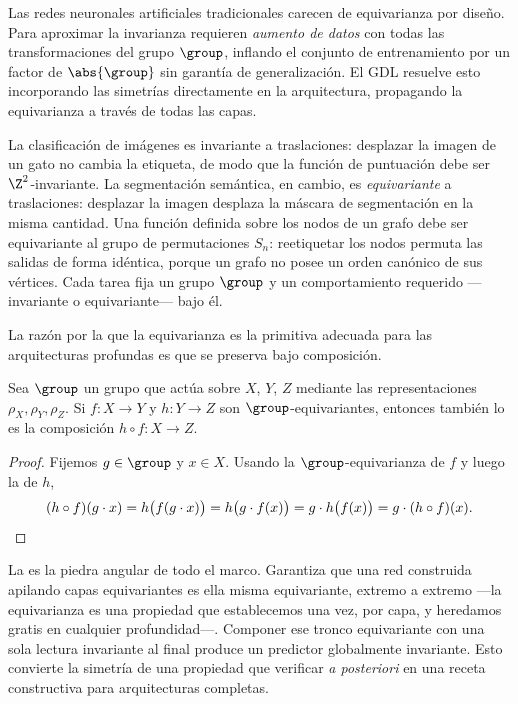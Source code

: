 Las redes neuronales artificiales tradicionales carecen de equivarianza por
dise\~no. Para aproximar la invarianza requieren \emph{aumento de datos} con todas
las transformaciones del grupo $\group$, inflando el conjunto de entrenamiento
por un factor de $\abs{\group}$ sin garant\'ia de generalizaci\'on. El GDL
resuelve esto incorporando las simetr\'ias directamente en la arquitectura,
propagando la equivarianza a trav\'es de todas las capas.

\begin{example}
\label{ex:priors:symmetries}
La clasificaci\'on de im\'agenes es invariante a traslaciones: desplazar la imagen
de un gato no cambia la etiqueta, de modo que la funci\'on de puntuaci\'on debe
ser $\Z^2$-invariante. La segmentaci\'on sem\'antica, en cambio, es
\emph{equivariante} a traslaciones: desplazar la imagen desplaza la m\'ascara de
segmentaci\'on en la misma cantidad. Una funci\'on definida sobre los nodos de un
grafo debe ser equivariante al grupo de permutaciones $S_n$: reetiquetar los
nodos permuta las salidas de forma id\'entica, porque un grafo no posee un orden
can\'onico de sus v\'ertices. Cada tarea fija un grupo $\group$ y un
comportamiento requerido ---invariante o equivariante--- bajo \'el.
\end{example}

La raz\'on por la que la equivarianza es la primitiva adecuada para las
arquitecturas profundas es que se preserva bajo composici\'on.

\begin{theorem}
\label{thm:priors:composition}
Sea $\group$ un grupo que act\'ua sobre $X$, $Y$, $Z$ mediante las
representaciones $\rho_X, \rho_Y, \rho_Z$. Si $f \colon X \to Y$ y
$h \colon Y \to Z$ son $\group$-equivariantes, entonces tambi\'en lo es la
composici\'on $h \circ f \colon X \to Z$.
\end{theorem}

\begin{proof}
Fijemos $g \in \group$ y $x \in X$. Usando la $\group$-equivarianza de $f$ y
luego la de $h$,
\[
  (h \circ f)(g \cdot x) = h\bigl(f(g \cdot x)\bigr)
    = h\bigl(g \cdot f(x)\bigr)
    = g \cdot h\bigl(f(x)\bigr)
    = g \cdot (h \circ f)(x). \qedhere
\]
\end{proof}

La  es la piedra angular de todo el marco. Garantiza
que una red construida apilando capas equivariantes es ella misma equivariante,
extremo a extremo ---la equivarianza es una propiedad que establecemos una vez,
por capa, y heredamos gratis en cualquier profundidad---. Componer ese tronco
equivariante con una sola lectura invariante al final produce un predictor
globalmente invariante. Esto convierte la simetr\'ia de una propiedad que
verificar \emph{a posteriori} en una receta constructiva para arquitecturas
completas.

